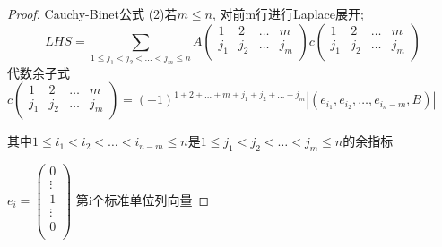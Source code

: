 \begin{proof}{Cauchy-Binet公式}{}
  (2)若$m\leq n$, 对前m行进行Laplace展开; 
  \[LHS=\sum_{1\leq j_1<j_2<\dots<j_m\leq n}
  A\begin{pmatrix}
    1 & 2 & \dots & m \\
    j_1 & j_2 & \dots & j_m \\
  \end{pmatrix}
  c\begin{pmatrix}
    1 & 2 & \dots & m \\
    j_1 & j_2 & \dots & j_m \\
  \end{pmatrix}
  \]
  代数余子式
  $c\begin{pmatrix}
    1 & 2 & \dots & m \\
    j_1 & j_2 & \dots & j_m \\
  \end{pmatrix}
  =(-1)^{1+2+\dots+m+j_1+j_2+\dots+j_m}|(e_{i_1},e_{i_2},\dots,e_{i_n-m},B)|$

  其中$1\leq i_1<i_2<\dots<i_{n-m}\leq n$是$1\leq j_1<j_2<\dots <j_m\leq n$的余指标

  $e_i=\begin{pmatrix}
    0 \\
    \vdots\\
    1\\
    \vdots\\
    0\\
  \end{pmatrix}$
  第i个标准单位列向量
  
\end{proof}



